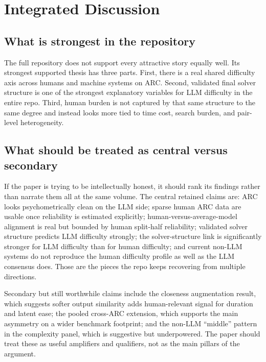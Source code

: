 \documentclass[11pt,letterpaper]{article}
\begin{document}
\section{Integrated Discussion}

\subsection{What is strongest in the repository}

The full repository does not support every attractive story equally well. Its strongest supported thesis has three parts. First, there is a real shared difficulty axis across humans and machine systems on ARC. Second, validated final solver structure is one of the strongest explanatory variables for LLM difficulty in the entire repo. Third, human burden is not captured by that same structure to the same degree and instead looks more tied to time cost, search burden, and pair-level heterogeneity.

\subsection{What should be treated as central versus secondary}

If the paper is trying to be intellectually honest, it should rank its findings rather than narrate them all at the same volume. The central retained claims are: ARC looks psychometrically clean on the LLM side; sparse human ARC data are usable once reliability is estimated explicitly; human-versus-average-model alignment is real but bounded by human split-half reliability; validated solver structure predicts LLM difficulty strongly; the solver-structure link is significantly stronger for LLM difficulty than for human difficulty; and current non-LLM systems do not reproduce the human difficulty profile as well as the LLM consensus does. Those are the pieces the repo keeps recovering from multiple directions.

Secondary but still worthwhile claims include the closeness augmentation result, which suggests softer output similarity adds human-relevant signal for duration and latent ease; the pooled cross-ARC extension, which supports the main asymmetry on a wider benchmark footprint; and the non-LLM ``middle'' pattern in the complexity panel, which is suggestive but underpowered. The paper should treat these as useful amplifiers and qualifiers, not as the main pillars of the argument.
\end{document}
